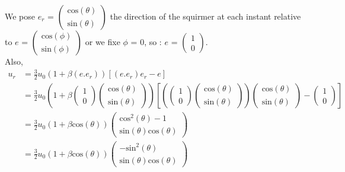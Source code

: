 \documentclass[options]{article}
\begin{document}
We pose $e_r$ = $\begin{pmatrix}
   \mathrm{cos}(\theta) \\
   \mathrm{sin}(\theta)
\end{pmatrix}$ the direction of the squirmer at each instant relative to $e$ = 
$\begin{pmatrix}
   \mathrm{cos}(\phi) \\
   \mathrm{sin}(\phi) \end{pmatrix}$ or we fixe $\phi$ = 0, so : $e$ = $\begin{pmatrix}
   1 \\
   0 \end{pmatrix}$.
\\ Also, 
\begin{align*}
u_r &= \frac{3}{2}u_0(1+\beta (e.e_r)) [(e.e_r)e_r - e] \\ 
&= \frac{3}{2}u_0\left(1+\beta \begin{pmatrix}
   1 \\
   0 \end{pmatrix}\begin{pmatrix}
   \mathrm{cos}(\theta) \\
   \mathrm{sin}(\theta)
\end{pmatrix}\right) \left[ \left( \begin{pmatrix}
   1 \\
   0 \end{pmatrix}\begin{pmatrix}
   \mathrm{cos}(\theta) \\
   \mathrm{sin}(\theta)
\end{pmatrix}\right) \begin{pmatrix}
   \mathrm{cos}(\theta) \\
   \mathrm{sin}(\theta)
\end{pmatrix} - \begin{pmatrix}
   1 \\
   0 \end{pmatrix}\right] \\
 &= \frac{3}{2}u_0\left(1+\beta \mathrm{cos}(\theta) \right) \begin{pmatrix}
   \mathrm{cos}^2(\theta)-1 \\
   \mathrm{sin}(\theta)\mathrm{cos}(\theta)
\end{pmatrix} \\
&= \frac{3}{2}u_0\left(1+\beta \mathrm{cos}(\theta) \right) \begin{pmatrix}
   -\mathrm{sin}^2(\theta) \\
   \mathrm{sin}(\theta)\mathrm{cos}(\theta)
\end{pmatrix} 
\end{align*}
\end{document}
